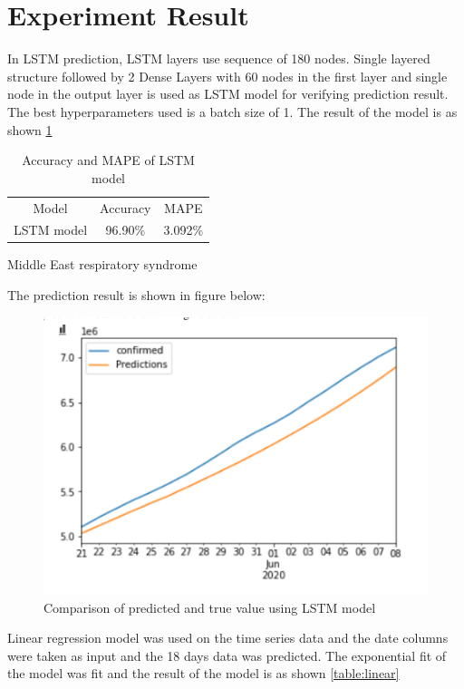 \newpage

\section{Experiment Result}

In LSTM prediction, LSTM layers use sequence of 180 nodes. Single layered structure followed by
2 Dense Layers with 60 nodes in the first layer and single node in the output layer is used as LSTM model for verifying prediction result. The best
hyperparameters used is a batch size of 1. The result of the model
is as shown \ref{table:lstm}

\begin{table}[ht!]
	\centering
	\caption{Accuracy and MAPE of LSTM model}
	\begin{tabular}{c c c}
		Model & Accuracy & MAPE \\
		LSTM model & 96.90\% & 3.092\%
	\end{tabular}
	\label{table:lstm}Middle East respiratory syndrome
\end{table}

The prediction result is shown in figure below:
\begin{figure}[ht!]
	\centering
	\includegraphics{images/lstm_graph.png}
	\caption{Comparison of predicted and true value using LSTM model}
	\label{fig:lstm_graph}
\end{figure}

Linear regression model was used on the time series data and the date columns were taken
as input and the 18 days data was predicted. The exponential fit of the model
was fit and the result of the model is as shown
\ref{table:linear}

